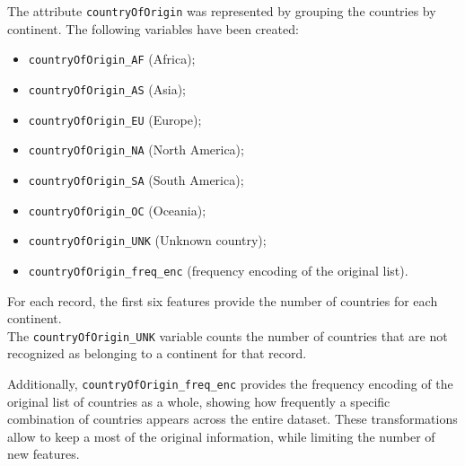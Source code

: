 The attribute \texttt{countryOfOrigin} was represented by grouping the countries by continent.
The following variables have been created: 
\begin{multicols}{2}
    \begin{itemize}
        \item \texttt{countryOfOrigin\_AF} (Africa);
        \item \texttt{countryOfOrigin\_AS} (Asia);
        \item \texttt{countryOfOrigin\_EU} (Europe);
        \item \texttt{countryOfOrigin\_NA} (North America);
        \item \texttt{countryOfOrigin\_SA} (South America);
        \item \texttt{countryOfOrigin\_OC} (Oceania);
        \item \texttt{countryOfOrigin\_UNK} (Unknown country);
        \item \texttt{countryOfOrigin\_freq\_enc} (frequency encoding of the original list).
    \end{itemize}
\end{multicols}


For each record, the first six features provide the number of countries for each continent.\\
The \texttt{countryOfOrigin\_UNK} variable counts the number of countries that are not recognized as belonging to a continent for that record.

Additionally, \texttt{countryOfOrigin\_freq\_enc} provides the frequency encoding of the original list of countries as a whole, 
showing how frequently a specific combination of countries appears across the entire dataset.
These transformations allow to keep a most of the original information, while limiting the number of new features.




